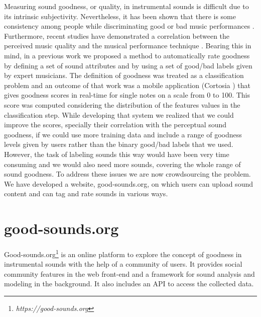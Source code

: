 \documentclass{article}
\begin{document}
Measuring sound goodness, or quality, in instrumental sounds is difficult due to its intrinsic subjectivity. Ne\-ver\-theless, it has been shown that there is some consistency among people while discriminating good or bad music performances \cite{1}. Furthermore, recent studies have demonstrated a correlation between the perceived music quality and the musical performance technique \cite{2}. Bearing this in mind, in a previous work \cite{01} we proposed a method to automatically rate goodness by defining a set of sound attributes and by using a set of good/bad labels given by expert musicians. The definition of goodness was treated as a classification problem and an outcome of that work was a mobile application (Cortosia \textregistered) that gives goodness scores in real-time for single notes on a scale from 0 to 100. This score was computed considering the distribution of the features values in the classification step. While developing that system we realized that we could improve the scores, specially their correlation with the perceptual sound goodness, if we could use more training data and include a range of goodness levels given by users rather than the binary good/bad labels that we used. However, the task of labeling sounds this way would have been very time consuming and we would  also need more sounds, covering the whole range of sound goodness. To address these issues we are now crowdsourcing the problem. We have developed a website, good-sounds.org, on which users can upload sound content and can tag and rate sounds in various ways.      
%
\section{good-sounds.org}\label{sec:goodsounds}
Good-sounds.org\footnote{\textit{https://good-sounds.org}} is an online platform to explore the concept of goodness in instrumental sounds with the help of a community of users. It provides social community features in the web front-end and a framework for sound analysis and modeling in the background. It also includes an API to access the collected data.
\end{document}
